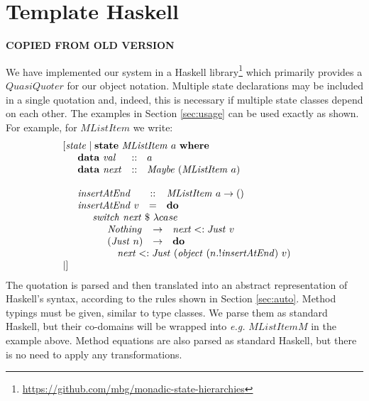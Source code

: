 \section{Template Haskell}
\label{sec:th}

\textbf{COPIED FROM OLD VERSION}

We have implemented our system in a Haskell library\footnote{\url{https://github.com/mbg/monadic-state-hierarchies}} which primarily provides a $\mathit{QuasiQuoter}$ \citep{mainland2007s} for our object notation. Multiple state declarations may be included in a single quotation and, indeed, this is necessary if multiple state classes depend on each other. The examples in Section \ref{sec:usage} can be used exactly as shown. For example, for $\mathit{MListItem}$ we write:
\begin{displaymath}
\begin{array}{l}
[\mathit{state}\mid \mathbf{state}~\mathit{MListItem}~a~\mathbf{where} \\
\quad \begin{array}{lcl}
\mathbf{data}~\mathit{val} & :: & a \\
\mathbf{data}~\mathit{next}  & :: & \mathit{Maybe}~(\mathit{MListItem}~a)
\end{array}\\\\
\quad \begin{array}{lcl}
\mathit{insertAtEnd} & :: & \mathit{MListItem}~a \to ()\\
\mathit{insertAtEnd}~v & = & \mathbf{do} \\
\multicolumn{3}{l}{\quad \begin{array}{l}
\mathit{switch}~\mathit{next}~\$~\lambda case \\
\quad \begin{array}{lcl}
\mathit{Nothing} & \to & \mathit{next} <: \mathit{Just}~v  \\
(\mathit{Just}~n) & \to & \mathbf{do} \\
\multicolumn{3}{l}{\quad \mathit{next} <: \mathit{Just}~(\mathit{object}~(n.!\mathit{insertAtEnd})~v) }
\end{array}
\end{array}}
\end{array}\\\mid]
\end{array}
\end{displaymath}
The quotation is parsed and then translated into an abstract representation of Haskell's syntax, according to the rules shown in Section \ref{sec:auto}. Method typings must be given, similar to type classes. We parse them as standard Haskell, but their co-domains will be wrapped into \emph{e.g.} $\mathit{MListItemM}$ in the example above. Method equations are also parsed as standard Haskell, but there is no need to apply any transformations. 


